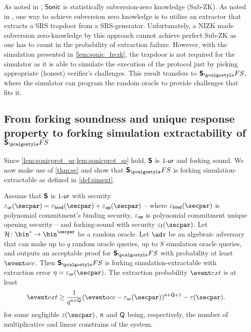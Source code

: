 \begin{remark} 
  As noted in \cite{CCS:MBKM19}, ${\textnormal{\textsf{Sonic}}}$ is statistically subversion-zero
  knowledge (Sub-ZK). As noted in \cite{AC:ABLZ17}, one way to achieve
  subversion zero knowledge is to utilise an extractor that extracts a SRS
  trapdoor from a SRS-generator. Unfortunately, a NIZK made subversion
  zero-knowledge by this approach cannot achieve perfect Sub-ZK as one has to
  count in the probability of extraction failure. However, with the simulation
  presented in \cref{lem:sonic_hvzk}, the trapdoor is not required for the
  simulator as it is able to simulate the execution of the protocol just by
  picking appropriate (honest) verifier's challenges. This result transfers to
  $\sonicprotfs$, where the simulator can program the random oracle to provide
  challenges that fits it.
\end{remark}

\subsection{From forking soundness and unique response property to forking
  simulation extractability of $\sonicprotfs$}
Since \cref{lem:sonicprot_ur,lem:sonicprot_ss} hold, $\bm{\mathsf{S}}$ is ${1\text{-}\mathsf{ur}}$
and forking sound. We now make use
of \cref{thm:se} and show that $\sonicprotfs$ is forking simulation-extractable as defined in \cref{def:simext}.

\begin{corollary}
  \label{thm:sonicprotfs_se}
  Assume that $\bm{\mathsf{S}}$ is ${1\text{-}\mathsf{ur}}$ with security
  $\epsur(\secpar) = \epsbind(\secpar) + \epsop(\secpar)$ -- where
  $\epsbind (\secpar)$ is polynomial commitment's binding security, $\varepsilon_{\mathsf{op}}$ is
  polynomial commitment unique opening security -- and forking-sound with
  security $\epsss(\secpar)$. Let $\ro\colon \bin^* \to \bin^\secpar$ be a
  random oracle. Let $\advse$ be an algebraic adversary that can make up to $q$
  random oracle queries, up to $S$ simulation oracle queries, and outputs an
  acceptable proof for $\sonicprotfs$ with probability at least $\accProb$. Then
  $\sonicprotfs$ is forking simulation-extractable with extraction error
  $\eta = \epsur(\secpar)$. The extraction probability $\extProb$ is at least
\[
		\extProb  \geq \frac{1}{q^{\multconstr + \linconstr}} (\accProb - \epsur(\secpar))^{\multconstr +
		\linconstr + 1} - \eps(\secpar).
	\]
	for some negligible $\eps(\secpar)$, $\mathsf{n}$ and $\mathsf{Q}$ being,
  respectively, the number of multiplicative and linear constrains of the system.
\end{corollary}
